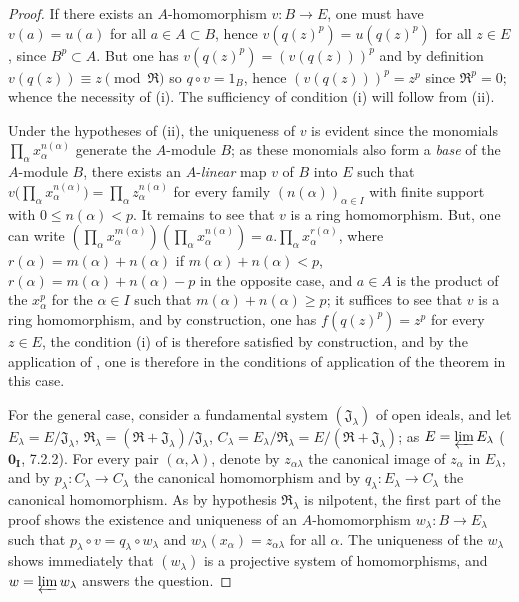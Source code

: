 \begin{proof}
If there exists an $A$-homomorphism $v:B\to E$, one must have $v(a)=u(a)$ for all $a\in A\subset B$, hence $v(q(z)^p)=u(q(z)^p)$ for all $z\in E$, since $B^p\subset A$.
But one has $v(q(z)^p)=(v(q(z)))^p$ and by definition $v(q(z))\equiv z\pmod{\mathfrak{R}}$ so $q\circ v=1_B$, hence $(v(q(z)))^p=z^p$ since $\mathfrak{R}^p=0$; whence the necessity of (i).
The sufficiency of condition (i) will follow from (ii).

Under the hypotheses of (ii), the uniqueness of $v$ is evident since the monomials $\prod_\alpha x_\alpha^{n(\alpha)}$ generate the $A$-module $B$; as these monomials also form a \emph{base} of the $A$-module $B$, there exists an $A$-\emph{linear} map $v$ of $B$ into $E$ such that $v\big(\prod_\alpha x_\alpha^{n(\alpha)}\big)=\prod_\alpha z_\alpha^{n(\alpha)}$ for every family $(n(\alpha))_{\alpha\in I}$ with finite support with $0\leq n(\alpha)<p$.
It remains to see that $v$ is a ring homomorphism.
But, one can write $(\prod_\alpha x_\alpha^{m(\alpha)})(\prod_\alpha x_\alpha^{n(\alpha)})=a.\prod_\alpha x_\alpha^{r(\alpha)}$, where $r(\alpha)=m(\alpha)+n(\alpha)$ if $m(\alpha)+n(\alpha)<p$, $r(\alpha)=m(\alpha)+n(\alpha)-p$ in the opposite case, and $a\in A$ is the product of the $x_\alpha^p$ for the $\alpha\in I$ such that $m(\alpha)+n(\alpha)\geq p$; it suffices to see that $v$ is a ring homomorphism, and by construction, one has $f(q(z)^p)=z^p$ for every $z\in E$, the condition (i) of  is therefore satisfied by construction, and by the application of , one is therefore in the conditions of application of the theorem in this case.

For the general case, consider a fundamental system $(\mathfrak{J}_\lambda)$ of open ideals, and let $E_\lambda=E/\mathfrak{J}_\lambda$, $\mathfrak{R}_\lambda=(\mathfrak{R}+\mathfrak{J}_\lambda)/\mathfrak{J}_\lambda$, $C_\lambda=E_\lambda/\mathfrak{R}_\lambda=E/(\mathfrak{R}+\mathfrak{J}_\lambda)$; as $E=\varprojlim E_\lambda$ ($\mathbf{0_I}$, 7.2.2).
For every pair $(\alpha,\lambda)$, denote by $z_{\alpha\lambda}$ the canonical image of $z_\alpha$ in $E_\lambda$, and by $p_\lambda:C_\lambda\to C_\lambda$ the canonical homomorphism and by $q_\lambda:E_\lambda\to C_\lambda$ the canonical homomorphism.
As by hypothesis $\mathfrak{R}_\lambda$ is nilpotent, the first part of the proof shows the existence and uniqueness of an $A$-homomorphism $w_\lambda:B\to E_\lambda$ such that $p_\lambda\circ v=q_\lambda\circ w_\lambda$ and $w_\lambda(x_\alpha)=z_{\alpha\lambda}$ for all $\alpha$.
The uniqueness of the $w_\lambda$ shows immediately that $(w_\lambda)$ is a projective system of homomorphisms, and $w=\varprojlim w_\lambda$ answers the question.
\end{proof}

